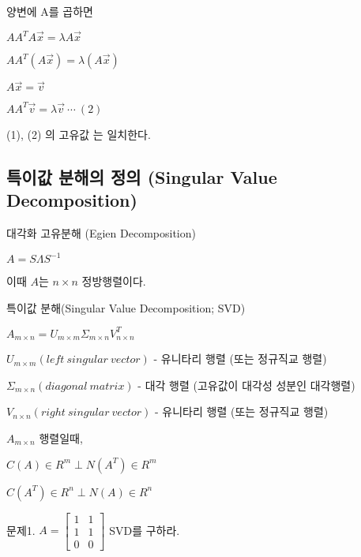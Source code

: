 양변에 A를 곱하면

$AA^TA\vec{x} = \lambda A\vec{x}$

$AA^T(A\vec{x}) = \lambda(A\vec{x})$

$A\vec{x} = \vec{v}$

$AA^T\vec{v} = \lambda\vec{v} \ \cdots \ (2)$

(1), (2) 의 고유값 \lambda 는 일치한다.




\newpage
\subsection{특이값 분해의 정의 (Singular Value Decomposition)}

\begin{definition} 
대각화 고유분해 (Egien Decomposition)

$A = S\Lambda S^{-1}$

이때 $A$는 $n \times n$ 정방행렬이다.

\end{definition}


\begin{definition} 
특이값 분해(Singular Value Decomposition; SVD)

$A_{m \times n}=U_{m \times m}\Sigma_{m \times n}V^T_{n \times n}$

$U_{m \times m} (left \ singular \ vector)$ - 유니타리 행렬 (또는 정규직교 행렬)

$\Sigma_{m \times n} (diagonal \ matrix)$ - 대각 행렬 (고유값이 대각성 성분인 대각행렬)

$V_{n \times n} (right \ singular \ vector)$ - 유니타리 행렬 (또는 정규직교 행렬)

\end{definition}

\begin{theorem}
$A_{m \times n}$ 행렬일때,

$C(A) \in R^m \perp N(A^T) \in R^m$

$C(A^T) \in R^n \perp N(A) \in R^n$
\end{theorem}


\newpage
문제1. $A=\begin{bmatrix}1 & 1 \\ 1 & 1 \\ 0 & 0 \end{bmatrix}$ SVD를 구하라.
